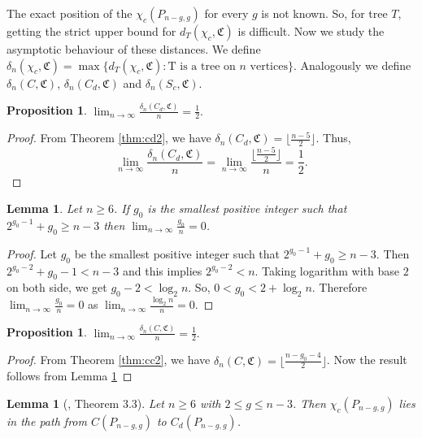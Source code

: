 \documentclass[11pt]{article}
\newtheorem{lemma}[theorem]{Lemma}
\newtheorem{proposition}[theorem]{Proposition}
\begin{document}
The exact position of the $\chi_c(P_{n-g,g})$ for every $g$ is not known. So, for tree $T$, getting the strict upper bound for $d_T(\chi_c,\mathfrak{C})$ is difficult. Now we study the asymptotic behaviour of these distances. We define $\delta_n(\chi_c,\mathfrak{C}) = \max\{d_T(\chi_c, \mathfrak{C}) : \mbox{T   is  a tree on $n$ vertices} \}$. Analogously we define $\delta_n(C,\mathfrak{C})$, $\delta_n(C_d,\mathfrak{C})$ and $\delta_n(S_c,\mathfrak{C})$.

\begin{proposition}\label{prop:a1} 
$\displaystyle\lim_{n \to \infty} \frac{\delta_n(C_d,\mathfrak{C})}{n} = \frac{1}{2}.$
\end{proposition}
\begin{proof}
From Theorem \ref{thm:cd2}, we have $\delta_n(C_d,\mathfrak{C})=\lfloor \frac{n-5}{2} \rfloor$. Thus, $$\displaystyle\lim_{n \to \infty} \frac{\delta_n(C_d,\mathfrak{C})}{n} =\displaystyle\lim_{n \to \infty}\frac{\lfloor \frac{n-5}{2} \rfloor}{n}=\frac{1}{2}.$$
\end{proof}
\begin{lemma}\label{lem:ch3}
Let $n\geq 6$. If $g_0$ is the smallest positive integer such that $2^{g_0-1}+g_0\geq n-3$ then $\displaystyle\lim_{n \to \infty}\frac{g_0}{n}=0$.
\end{lemma}
\begin{proof}
Let $g_0$ be the smallest positive integer such that  $2^{g_0-1}+g_0\geq n-3$. Then $2^{g_0-2}+g_0-1< n-3$ and this implies $2^{g_0-2}<n$. Taking logarithm with base $2$ on both side,  we get $g_0-2<\log_2 n$. So, $0<g_0<2+\log_2n$. Therefore $\displaystyle\lim_{n \to \infty}\frac{g_0}{n}=0$ as $\displaystyle\lim_{n \to \infty}\frac{\log_2n}{n}=0$.
\end{proof}
\begin{proposition}\label{prop:a2} 
$\displaystyle\lim_{n \to \infty} \frac{\delta_n(C,\mathfrak{C})}{n} = \frac{1}{2}.$
\end{proposition}
\begin{proof}
From Theorem \ref{thm:cc2}, we have $\delta_n(C,\mathfrak{C})=\lfloor \frac{n-g_0-4}{2} \rfloor$. Now the result follows from Lemma \ref{lem:ch3}
\end{proof}

\begin{lemma}[\cite{Klp}, Theorem 3.3]\label{lem:ch4}
Let $n\geq 6$ with $2\leq g \leq n-3$. Then  $\chi_c(P_{n-g,g})$ lies in the path from $C(P_{n-g,g})$ to $C_d(P_{n-g,g})$.
\end{lemma}
\end{document}
